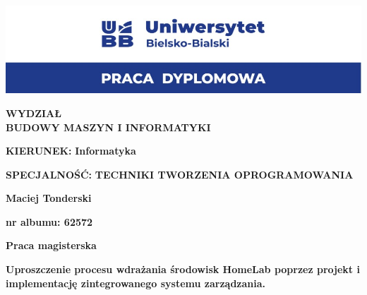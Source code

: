 \begin{titlepage}
    \begin{center}
    
    \includegraphics[width=1\textwidth]{images/logo.jpg} %
    
    \vspace{1cm}
    
    
    \textbf{\large WYDZIAŁ} \\
    \textbf{\large BUDOWY MASZYN I INFORMATYKI} \\
    
    \vspace{0.3cm}
    
    \textbf{\large KIERUNEK:} \textbf{Informatyka} \\
    
    \vspace{0.3cm}
    
    \textbf{\large SPECJALNOŚĆ:} \textbf{TECHNIKI TWORZENIA OPROGRAMOWANIA}
    
    \vspace{2cm}
    
    \textbf{\Large Maciej Tonderski} \\
    
    \vspace{0.5cm}
    
    \textbf{nr albumu:  62572} \\
    
    \vspace{0.5cm}
    
    \textbf{\large Praca magisterska}
    
    \vspace{1.5cm}
    
    \textbf{\LARGE Uproszczenie procesu wdrażania środowisk HomeLab poprzez projekt i implementację zintegrowanego systemu zarządzania.} \\
    
    \vspace{0.5cm}
    

\end{center}
\end{titlepage}

